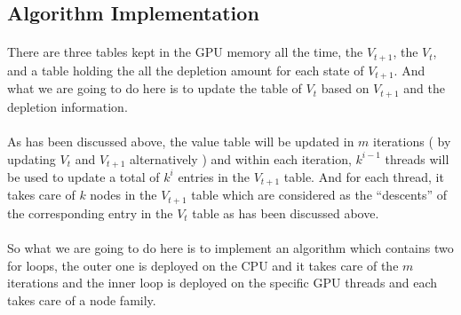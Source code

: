 \documentclass[11pt,reqno]{article}
\begin{document}
\subsection*{Algorithm Implementation}
\paragraph{} There are three tables kept in the GPU memory all the time, the $V_{t + 1}$, the $V_{t}$, and a table holding the all the depletion amount for each state of $V_{t + 1}$. And what we are going to do here is to update the table of $V_{t}$ based on $V_{t + 1}$ and the depletion information.
\paragraph{} As has been discussed above, the value table will be updated in $m$ iterations ( by updating $V_{t}$ and $V_{t+1}$ alternatively ) and within each iteration, $k^{i - 1}$ threads will be used to update a total of $k^{i}$ entries in the $V_{t+1}$ table. And for each thread, it takes care of $k$ nodes in the $V_{t+1}$ table which are considered as the ``descents'' of the corresponding entry in the $V_{t}$ table as has been discussed above.
\paragraph{} So what we are going to do here is to implement an algorithm which contains two for loops, the outer one is deployed on the CPU and it takes care of the $m$ iterations and the inner loop is deployed on the specific GPU threads and each takes care of a node family.
\end{document}
